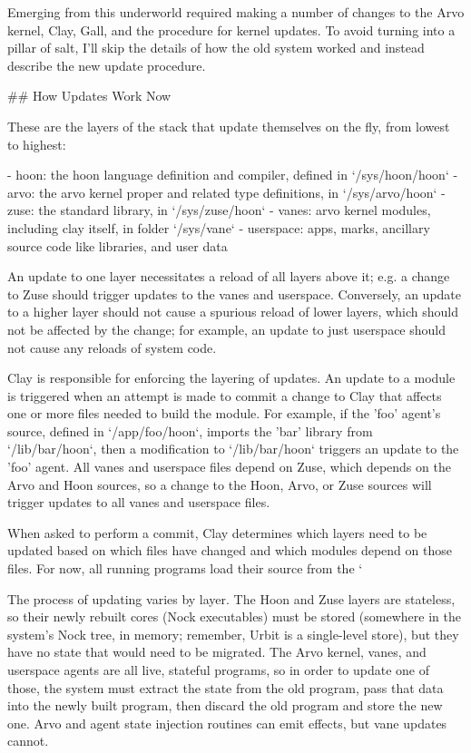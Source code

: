 \documentclass[twoside]{article}
\begin{document}
Emerging from this underworld required making a number of changes to the Arvo kernel, Clay, Gall, and the procedure for kernel updates. To avoid turning into a pillar of salt, I'll skip the details of how the old system worked and instead describe the new update procedure.

## How Updates Work Now

These are the layers of the stack that update themselves on the fly, from lowest to highest:

- hoon: the hoon language definition and compiler, defined in `/sys/hoon/hoon`
- arvo: the arvo kernel proper and related type definitions, in `/sys/arvo/hoon`
- zuse: the standard library, in `/sys/zuse/hoon`
- vanes: arvo kernel modules, including clay itself, in folder `/sys/vane`
- userspace: apps, marks, ancillary source code like libraries, and user data

An update to one layer necessitates a reload of all layers above it; e.g. a change to Zuse should trigger updates to the vanes and userspace. Conversely, an update to a higher layer should not cause a spurious reload of lower layers, which should not be affected by the change; for example, an update to just userspace should not cause any reloads of system code.

Clay is responsible for enforcing the layering of updates. An update to a module is triggered when an attempt is made to commit a change to Clay that affects one or more files needed to build the module. For example, if the 'foo' agent's source, defined in `/app/foo/hoon`, imports the 'bar' library from `/lib/bar/hoon`, then a modification to `/lib/bar/hoon` triggers an update to the 'foo' agent. All vanes and userspace files depend on Zuse, which depends on the Arvo and Hoon sources, so a change to the Hoon, Arvo, or Zuse sources will trigger updates to all vanes and userspace files.

When asked to perform a commit, Clay determines which layers need to be updated based on which files have changed and which modules depend on those files. For now, all running programs load their source from the `%

The process of updating varies by layer. The Hoon and Zuse layers are stateless, so their newly rebuilt cores (Nock executables) must be stored (somewhere in the system’s Nock tree, in memory; remember, Urbit is a single-level store), but they have no state that would need to be migrated. The Arvo kernel, vanes, and userspace agents are all live, stateful programs, so in order to update one of those, the system must extract the state from the old program, pass that data into the newly built program, then discard the old program and store the new one. Arvo and agent state injection routines can emit effects, but vane updates cannot.
\end{document}
